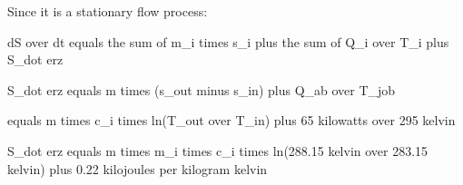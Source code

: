 Since it is a stationary flow process:  

dS over dt equals the sum of m_i times s_i plus the sum of Q_i over T_i plus S_dot erz  

S_dot erz equals m times (s_out minus s_in) plus Q_ab over T_job  

equals m times c_i times ln(T_out over T_in) plus 65 kilowatts over 295 kelvin  

S_dot erz equals m times m_i times c_i times ln(288.15 kelvin over 283.15 kelvin) plus 0.22 kilojoules per kilogram kelvin